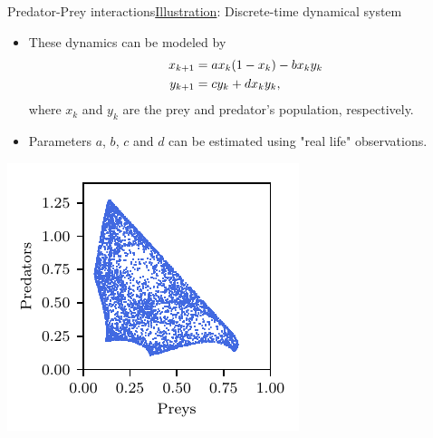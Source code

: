 \documentclass[usenames,dvipsnames,svgnames,10pt,aspectratio=169]{beamer}
\begin{document}
%

\begin{frame}[t, c]{Predator-Prey interactions}{\underline{Illustration}: Discrete-time dynamical system}
	\begin{minipage}{.48\textwidth}
		\begin{itemize}
			\item These dynamics can be modeled by
			\begin{equation}
				\begin{aligned}
					x_{k+1} & = a x_k ( 1 - x_k ) - b x_k y_k \\
					y_{k+1} & = c y_k + d x_k y_k,
				\end{aligned}
				\notag
			\end{equation}
			where $x_k$ and $y_k$ are the prey and predator's population, respectively.

			\bigskip

			\item Parameters $a$, $b$, $c$ and $d$ can be estimated using "real life" observations.
		\end{itemize}
	\end{minipage}%
	\hfill
	\begin{minipage}{.48\textwidth}
		\centering
		\includegraphics[width=.8\textwidth]{lotka_volterra}
	\end{minipage}

	\vspace{1cm}
\end{frame}
\end{document}
